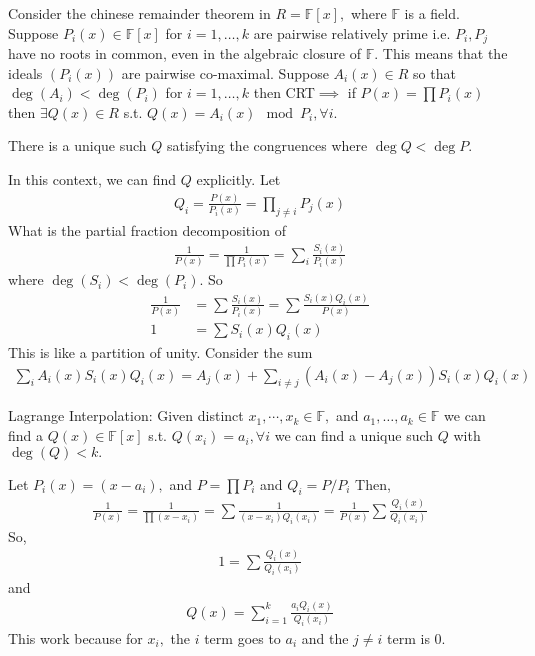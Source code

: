\documentclass[a4paper]{article}
\begin{document}
Consider the chinese remainder theorem in $R=\mathbb F[x],$ where $\mathbb F$ is a field. Suppose $P_i(x)\in\mathbb F[x]$ for $i=1,\ldots,k$ are pairwise relatively prime i.e. $P_i,P_j$ have no roots in common, even in the algebraic closure of $\mathbb F.$ This means that the ideals $(P_i(x))$ are pairwise co-maximal. Suppose $A_i(x)\in R$ so that $\deg(A_i)<\deg(P_i)$ for $i=1,\ldots,k$ then CRT$\implies$ if $P(x)=\prod P_i(x)$ then $\exists Q(x)\in R$ s.t. $Q(x)=A_i(x)\mod P_i,\forall i.$

There is a unique such $Q$ satisfying the congruences where $\deg Q<\deg P.$

In this context, we can find $Q$ explicitly. Let \begin{align}
    Q_i=\frac{P(x)}{P_i(x)}=\prod_{j\neq i}P_j(x)
\end{align}
What is the partial fraction decomposition of \begin{align}
    \frac{1}{P(x)}=\frac{1}{\prod P_i(x)}=\sum_i\frac{S_i(x)}{P_i(x)}
\end{align}
where $\deg(S_i)<\deg(P_i).$ So \begin{align}
\frac{1}{P(x)}&=\sum\frac{S_i(x)}{P_i(x)}=\sum\frac{S_i(x)Q_i(x)}{P(x)}\\
1&=\sum S_i(x)Q_i(x)
\end{align}
This is like a partition of unity. Consider the sum \begin{align}
    \sum_iA_i(x)S_i(x)Q_i(x)=A_j(x)+\sum_{i\neq j}(A_i(x)-A_j(x))S_i(x)Q_i(x)
\end{align}

Lagrange Interpolation: Given distinct $x_1,\cdots,x_k\in\mathbb F,$ and $a_1,\ldots,a_k\in\mathbb F$ we can find a $Q(x)\in \mathbb F[x]$ s.t. $Q(x_i)=a_i,\forall i$ we can find a unique such $Q$ with $\deg(Q)<k.$

Let $P_i(x)=(x-a_i),$ and $P=\prod P_i$ and $Q_i=P/P_i$ Then, \begin{align}
    \frac{1}{P(x)}=\frac{1}{\prod(x-x_i)}=\sum\frac{1}{(x-x_i)Q_i(x_i)}=\frac{1}{P(x)}\sum\frac{Q_i(x)}{Q_i(x_i)}
\end{align}
So, \begin{align}
    1=\sum\frac{Q_i(x)}{Q_i(x_i)}
\end{align}
and \begin{align}
    Q(x)=\sum_{i=1}^k\frac{a_iQ_i(x)}{Q_i(x_i)}
\end{align}
This work because for $x_i,$ the $i$ term goes to $a_i$ and the $j\neq i$ term is $0.$
\end{document}
